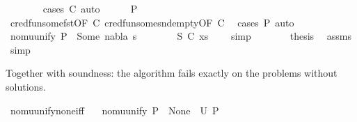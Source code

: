 \begin{isabellebody}
\ \ \ \ \ \ \isamarkupfalse%
\ {\isacharparenleft}{\kern0pt}cases\ C{\isacharparenright}{\kern0pt}\ auto\isanewline
\ \ \ \ \isamarkupfalse%
\ {\isachardoublequoteopen}P{}\ {\isacharequal}{\kern0pt}\ {\isacharparenleft}{\kern0pt}{\isacharbrackleft}{\kern0pt}{\isacharbrackright}{\kern0pt}{\isacharcomma}{\kern0pt}{\isacharbrackleft}{\kern0pt}{\isacharbrackright}{\kern0pt}{\isacharparenright}{\kern0pt}{\isachardoublequoteclose}\isanewline
\ \ \ \ \ \ \isamarkupfalse%
\ cred{\isacharunderscore}{\kern0pt}fun{\isacharunderscore}{\kern0pt}some{\isacharunderscore}{\kern0pt}fst{\isacharbrackleft}{\kern0pt}OF\ C{\isacharbrackright}{\kern0pt}\ cred{\isacharunderscore}{\kern0pt}fun{\isacharunderscore}{\kern0pt}some{\isacharunderscore}{\kern0pt}snd{\isacharunderscore}{\kern0pt}empty{\isacharbrackleft}{\kern0pt}OF\ C{\isacharbrackright}{\kern0pt}\ \isamarkupfalse%
\ {\isacharparenleft}{\kern0pt}cases\ P{}{\isacharparenright}{\kern0pt}\ auto\isanewline
\ \ \ \ \isamarkupfalse%
\ {\isachardoublequoteopen}nomu{\isacharunderscore}{\kern0pt}unify\ P\ {\isacharequal}{\kern0pt}\ Some\ {\isacharparenleft}{\kern0pt}nabla{}{\isacharcomma}{\kern0pt}\ s{}{\isacharprime}{\kern0pt}{\isacharparenright}{\kern0pt}{\isachardoublequoteclose}\isanewline
\ \ \ \ \ \ \isamarkupfalse%
\ S\ C\ {\isacartoucheopen}xs\ {\isacharequal}{\kern0pt}\ {\isacharbrackleft}{\kern0pt}{\isacharbrackright}{\kern0pt}{\isacartoucheclose}\ \isamarkupfalse%
\ simp\isanewline
\ \ \ \ \isamarkupfalse%
\ \isamarkupfalse%
\ {\isacharquery}{\kern0pt}thesis\ \isamarkupfalse%
\ assms\ \isamarkupfalse%
\ simp\isanewline
\ \ \isamarkupfalse%
\isanewline
{}\isamarkupfalse%
%
\endisatagproof
{\isafoldproof}%
%
\isadelimproof
%
\endisadelimproof
%
\begin{isamarkuptext}%
Together with soundness: the algorithm fails exactly on the problems without solutions.%
\end{isamarkuptext}\isamarkuptrue%
\isamarkupfalse%
\ nomu{\isacharunderscore}{\kern0pt}unify{\isacharunderscore}{\kern0pt}none{\isacharunderscore}{\kern0pt}iff{\isacharcolon}{\kern0pt}\isanewline
\ \ \ {\isachardoublequoteopen}nomu{\isacharunderscore}{\kern0pt}unify\ P\ {\isacharequal}{\kern0pt}\ None\ {\isasymlongleftrightarrow}\ U\ P\ {\isacharequal}{\kern0pt}\ {\isacharbraceleft}{\kern0pt}{\isacharbraceright}{\kern0pt}{\isachardoublequoteclose}\isanewline

\end{isabellebody}
